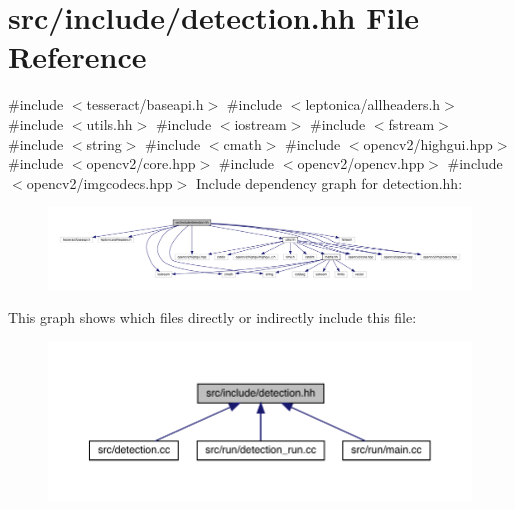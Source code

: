 \hypertarget{detection_8hh}{}\section{src/include/detection.hh File Reference}
\label{detection_8hh}
{\ttfamily \#include $<$tesseract/baseapi.\+h$>$}\newline
{\ttfamily \#include $<$leptonica/allheaders.\+h$>$}\newline
{\ttfamily \#include $<$utils.\+hh$>$}\newline
{\ttfamily \#include $<$iostream$>$}\newline
{\ttfamily \#include $<$fstream$>$}\newline
{\ttfamily \#include $<$string$>$}\newline
{\ttfamily \#include $<$cmath$>$}\newline
{\ttfamily \#include $<$opencv2/highgui.\+hpp$>$}\newline
{\ttfamily \#include $<$opencv2/core.\+hpp$>$}\newline
{\ttfamily \#include $<$opencv2/opencv.\+hpp$>$}\newline
{\ttfamily \#include $<$opencv2/imgcodecs.\+hpp$>$}\newline
Include dependency graph for detection.\+hh\+:
\nopagebreak
\begin{figure}[H]
\begin{center}
\leavevmode
\includegraphics[width=350pt]{detection_8hh__incl}
\end{center}
\end{figure}
This graph shows which files directly or indirectly include this file\+:
\nopagebreak
\begin{figure}[H]
\begin{center}
\leavevmode
\includegraphics[width=350pt]{detection_8hh__dep__incl}
\end{center}
\end{figure}
